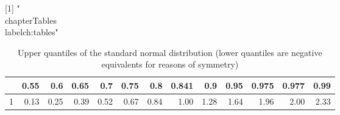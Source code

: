 [1] "\\chapter{Tables}\\label{ch:tables}"
\begin{table}[ht]
\centering
\begin{tabular}{rrrrrrrrrrrrr}
  \hline
 & 0.55 & 0.6 & 0.65 & 0.7 & 0.75 & 0.8 & 0.841 & 0.9 & 0.95 & 0.975 & 0.977 & 0.99 \\ 
  \hline
1 & 0.13 & 0.25 & 0.39 & 0.52 & 0.67 & 0.84 & 1.00 & 1.28 & 1.64 & 1.96 & 2.00 & 2.33 \\ 
   \hline
\end{tabular}
\caption{Upper quantiles of the standard normal distribution (lower quantiles are negative equivalents for reasons of symmetry)} 
\end{table}
